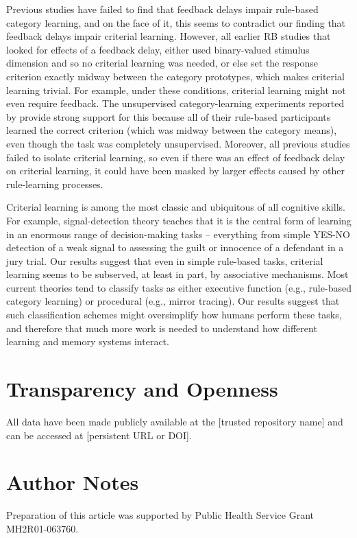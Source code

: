 \documentclass[doc, floatsintext]{apa7}
\begin{document}
Previous studies have failed to find that feedback delays
impair rule-based category learning, and on the face of it,
this seems to contradict our finding that feedback delays
impair criterial learning. However, all earlier RB studies
that looked for effects of a feedback delay, either used
binary-valued stimulus dimension and so no criterial
learning was needed, or else set the response criterion
exactly midway between the category prototypes, which makes
criterial learning trivial. For example, under these
conditions, criterial learning might not even require
feedback. The unsupervised category-learning experiments
reported by \textcite{ashby1999dominance} provide strong
support for this because all of their rule-based
participants learned the correct criterion (which was midway
between the category means), even though the task was
completely unsupervised. Moreover, all previous studies
failed to isolate criterial learning, so even if there was
an effect of feedback delay on criterial learning, it could
have been masked by larger effects caused by other
rule-learning processes.

Criterial learning is among the most classic and ubiquitous
of all cognitive skills. For example, signal-detection
theory teaches that it is the central form of learning in an
enormous range of decision-making tasks -- everything from
simple YES-NO detection of a weak signal to assessing the
guilt or innocence of a defendant in a jury trial. Our
results suggest that even in simple rule-based tasks,
criterial learning seems to be subserved, at least in part,
by associative mechanisms. Most current theories tend to
classify tasks as either executive function (e.g.,
rule-based category learning) or procedural (e.g., mirror
tracing). Our results suggest that such classification
schemes might oversimplify how humans perform these tasks,
and therefore that much more work is needed to understand
how different learning and memory systems interact.

\section{Transparency and Openness}
All data have been made publicly available at the [trusted
repository name] and can be accessed at [persistent URL or
DOI].

\section{Author Notes}
Preparation of this article was supported by Public Health
Service Grant MH2R01-063760.

\printbibliography
\end{document}
